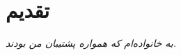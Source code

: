 \chapter*{تقدیم}

\vfill
\begin{flushright}
\itshape
به خانواده‌ام که همواره پشتیبان من بودند.
\end{flushright}
\vfill
\cleardoublepage
